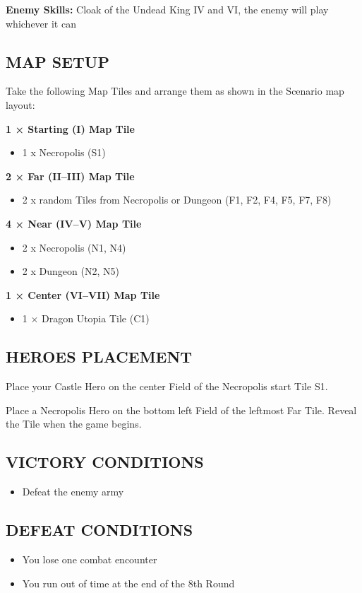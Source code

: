 \begin{multicols*}{2}
\textbf{Enemy Skills:} Cloak of the Undead King IV and VI, the enemy will play whichever it can

\subsection*{\MakeUppercase{Map setup}}

Take the following Map Tiles and arrange them as shown in the Scenario map layout:

\textbf{1 × Starting (I) Map Tile}
\begin{itemize}
    \item 1 x Necropolis (S1)
\end{itemize}

\textbf{2 × Far (II--III) Map Tile}
\begin{itemize}
    \item 2 x random Tiles from Necropolis or Dungeon (F1, F2, F4, F5, F7, F8)
\end{itemize}

\textbf{4 × Near (IV--V) Map Tile}
\begin{itemize}
    \item 2 x Necropolis (N1, N4)
    \item 2 x Dungeon (N2, N5)
\end{itemize}

\textbf{1 × Center (VI--VII) Map Tile}
\begin{itemize}
  \item 1 × Dragon Utopia Tile (C1)
\end{itemize}

\subsection*{\MakeUppercase{Heroes placement}}

Place your Castle Hero on the center Field of the Necropolis start Tile S1.

Place a Necropolis Hero on the bottom left Field of the leftmost Far Tile. 
Reveal the Tile when the game begins.

\subsection*{\MakeUppercase{Victory Conditions}}

\begin{itemize}
  \item Defeat the enemy army
\end{itemize}


\subsection*{\MakeUppercase{Defeat Conditions}}
\begin{itemize}
  \item You lose one combat encounter
  \item You run out of time at the end of the 8th Round
\end{itemize}
\end{multicols*}

